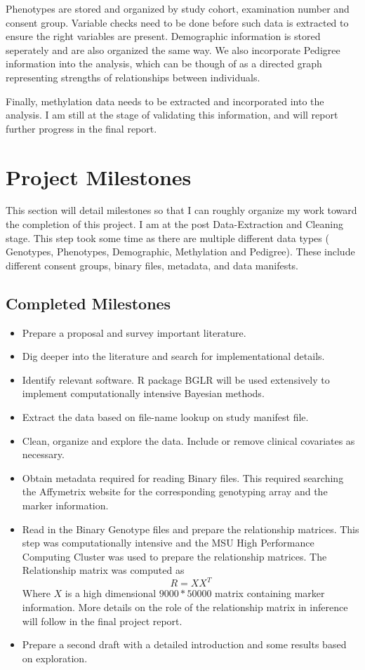 \documentclass{sig-alternate-05-2015}
\begin{document}
Phenotypes are stored and organized by study cohort, examination number and consent group.
Variable checks need to be done before such data is extracted to ensure the right variables are present.
Demographic information is stored seperately and are also organized the same way.
We also incorporate Pedigree information into the analysis, which can be though of as a directed graph representing strengths of relationships between individuals.

Finally, methylation data needs to be extracted and incorporated into the analysis. I am still at the stage of validating this information, and will report further progress in the final report.

\section{Project Milestones}

This section will detail milestones so that I can roughly organize my work
toward the completion of this project. I am at the post Data-Extraction and Cleaning stage.
This step took some time as there are multiple different data types ( Genotypes, Phenotypes, Demographic, Methylation and Pedigree).
These include different consent groups, binary files, metadata, and data manifests.

\subsection{Completed Milestones}

\begin{itemize}
\item Prepare a proposal and survey important literature.
\item Dig deeper into the literature and search for implementational details.
\item Identify relevant software. R package BGLR will be used extensively to implement computationally intensive Bayesian methods.
\item Extract the data based on file-name lookup on study manifest file.
\item Clean, organize and explore the data. Include or remove clinical covariates as necessary.
\item Obtain metadata required for reading Binary files. This required searching the Affymetrix website for the corresponding genotyping array and the marker information.
\item Read in the Binary Genotype files and prepare the relationship matrices. This step was computationally intensive and the MSU High Performance Computing Cluster was used to prepare the relationship matrices.
The Relationship matrix was computed as \begin{equation}
R = XX^T
\end{equation}
Where $X$ is a high dimensional $9000*50000$ matrix containing marker information. More details on the role of the relationship matrix in inference will follow in the final project report.
\item Prepare a second draft with a detailed introduction and some results based on exploration.
\end{itemize}
\end{document}

